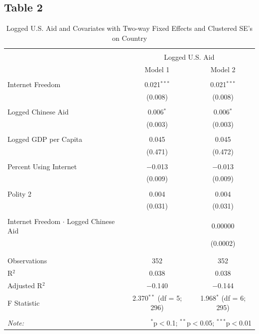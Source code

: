 \documentclass[12pt]{article}
\begin{document}
\subsection*{Table 2}
\begin{table}[!htbp] \centering 
  \caption*{Logged U.S. Aid and Covariates with Two-way Fixed Effects and Clustered SE's on Country}
  \label{} 
\begin{tabular}{@{\extracolsep{5pt}}lcc} 
\\[-1.8ex]\hline 
\hline \\[-1.8ex] 
 & \multicolumn{2}{c}{Logged U.S. Aid} \\ 
\cline{2-3} 
 & Model 1 & Model 2 \\ 
\hline \\[-1.8ex] 
 Internet Freedom & 0.021$^{***}$ & 0.021$^{***}$ \\ 
  & (0.008) & (0.008) \\ 
  & & \\ 
 Logged Chinese Aid & 0.006$^{*}$ & 0.006$^{*}$ \\ 
  & (0.003) & (0.003) \\ 
  & & \\ 
 Logged GDP per Capita & 0.045 & 0.045 \\ 
  & (0.471) & (0.472) \\ 
  & & \\ 
 Percent Using Internet & $-$0.013 & $-$0.013 \\ 
  & (0.009) & (0.009) \\ 
  & & \\ 
 Polity 2 & 0.004 & 0.004 \\ 
  & (0.031) & (0.031) \\ 
  & & \\ 
 Internet Freedom $\cdot$ Logged Chinese Aid &  & 0.00000 \\ 
  &  & (0.0002) \\ 
  & & \\ 
\hline \\[-1.8ex] 
Observations & 352 & 352 \\ 
R$^{2}$ & 0.038 & 0.038 \\ 
Adjusted R$^{2}$ & $-$0.140 & $-$0.144 \\ 
F Statistic & 2.370$^{**}$ (df = 5; 296) & 1.968$^{*}$ (df = 6; 295) \\ 
\hline 
\hline \\[-1.8ex] 
\textit{Note:}  & \multicolumn{2}{r}{$^{*}$p$<$0.1; $^{**}$p$<$0.05; $^{***}$p$<$0.01} \\ 
\end{tabular} 
\end{table}
\pagebreak
\end{document}
